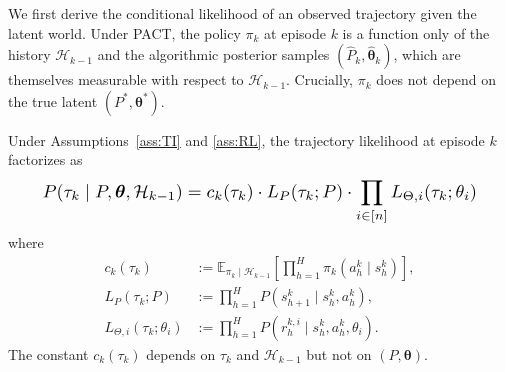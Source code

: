 We first derive the conditional likelihood of an observed trajectory given the latent world. Under PACT, the policy $\pi_k$ at episode $k$ is a function only of the history $\mathcal{H}_{k-1}$ and the algorithmic posterior samples $(\hat{P}_k, \hat{\boldsymbol{\theta}}_k)$, which are themselves measurable with respect to $\mathcal{H}_{k-1}$. Crucially, $\pi_k$ does not depend on the true latent $(P^*, \boldsymbol{\theta}^*)$.

\begin{lemma}
\label{lem:likelihood}
Under Assumptions~\ref{ass:TI} and \ref{ass:RL}, the trajectory likelihood at episode $k$ factorizes as
\begin{equation}\label{eq:lik-factor}\resizebox{0.9\linewidth}{!}{$\displaystyle P(\tau_k \mid P, \boldsymbol{\theta}, \mathcal{H}_{k-1}) = c_k(\tau_k) \cdot L_P(\tau_k; P) \cdot \prod_{i \in [n]} L_{\Theta,i}(\tau_k; \theta_i) $}\end{equation}
where
\begin{align}
c_k(\tau_k) &:= \mathbb{E}_{\pi_k \mid \mathcal{H}_{k-1}}\left[\prod_{h=1}^H \pi_k(a_h^k \mid s_h^k)\right], \label{eq:ck} \\
L_P(\tau_k; P) &:= \prod_{h=1}^H P(s_{h+1}^k \mid s_h^k, a_h^k), \label{eq:lp} \\
L_{\Theta,i}(\tau_k; \theta_i) &:= \prod_{h=1}^H P(r_h^{k,i} \mid s_h^k, a_h^k, \theta_i). \label{eq:ltheta}
\end{align}
The constant $c_k(\tau_k)$ depends on $\tau_k$ and $\mathcal{H}_{k-1}$ but not on $(P, \boldsymbol{\theta})$.
\end{lemma}

